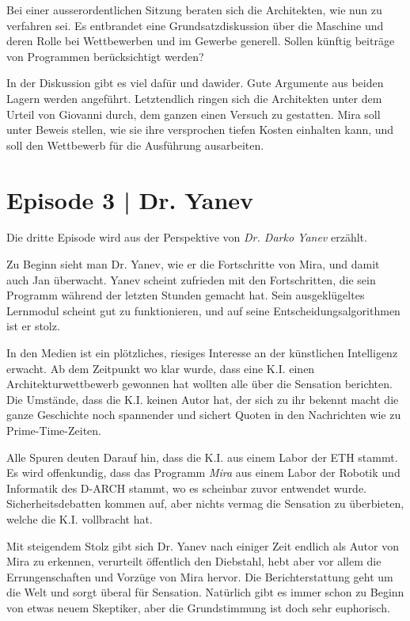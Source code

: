 \documentclass[11pt,a4paper,ngerman]{scrreprt}
\begin{document}
Bei einer ausserordentlichen Sitzung beraten sich die Architekten, wie nun zu
verfahren sei. Es entbrandet eine Grundsatzdiskussion über die Maschine und
deren Rolle bei Wettbewerben und im Gewerbe generell. Sollen künftig beiträge
von Programmen berücksichtigt werden?

In der Diskussion gibt es viel dafür und dawider. Gute Argumente aus beiden
Lagern werden angeführt. Letztendlich ringen sich die Architekten unter dem
Urteil von Giovanni durch, dem ganzen einen Versuch zu gestatten. Mira soll
unter Beweis stellen, wie sie ihre versprochen tiefen Kosten einhalten kann, und
soll den Wettbewerb für die Ausführung ausarbeiten.

\section*{Episode 3 | Dr. Yanev}

Die dritte Episode wird aus der Perspektive von \emph{Dr. Darko Yanev} erzählt.

Zu Beginn sieht man Dr. Yanev, wie er die Fortschritte von Mira, und damit auch
Jan überwacht. Yanev scheint zufrieden mit den Fortschritten, die sein Programm
während der letzten Stunden gemacht hat. Sein ausgeklügeltes Lernmodul scheint
gut zu funktionieren, und auf seine Entscheidungsalgorithmen ist er stolz.

In den Medien ist ein plötzliches, riesiges Interesse an der künstlichen
Intelligenz erwacht. Ab dem Zeitpunkt wo klar wurde, dass eine K.I. einen
Architekturwettbewerb gewonnen hat wollten alle über die Sensation
berichten. Die Umstände, dass die K.I. keinen Autor hat, der sich zu ihr bekennt
macht die ganze Geschichte noch spannender und sichert Quoten in den Nachrichten
wie zu Prime-Time-Zeiten.

Alle Spuren deuten Darauf hin, dass die K.I. aus einem Labor der ETH stammt. Es
wird offenkundig, dass das Programm \emph{Mira} aus einem Labor der Robotik und
Informatik des D-ARCH stammt, wo es scheinbar zuvor entwendet
wurde. Sicherheitsdebatten kommen auf, aber nichts vermag die Sensation zu
überbieten, welche die K.I. vollbracht hat.

Mit steigendem Stolz gibt sich Dr. Yanev nach einiger Zeit endlich als Autor von
Mira zu erkennen, verurteilt öffentlich den Diebstahl, hebt aber vor allem die
Errungenschaften und Vorzüge von Mira hervor. Die Berichterstattung geht um die
Welt und sorgt überal für Sensation. Natürlich gibt es immer schon zu Beginn von
etwas neuem Skeptiker, aber die Grundstimmung ist doch sehr euphorisch.
\end{document}
